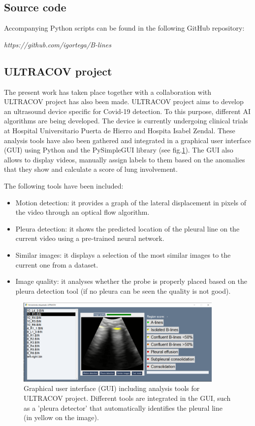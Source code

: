 \documentclass[12pt]{article} %
\begin{document}
\subsection{Source code}
Accompanying Python scripts can be found in the following GitHub repository:

{\textit{https://github.com/igortega/B-lines}}


\subsection{ULTRACOV project}
	The present work has taken place together with a collaboration with ULTRACOV project has also been made. ULTRACOV project \cite{ultracov} aims to develop an ultrasound device specific for Covid-19 detection. To this purpose, different AI algorithms are being developed. The device is currently undergoing clinical trials at Hospital Universitario Puerta de Hierro and Hospita Isabel Zendal.
	These analysis tools have also been gathered and integrated in a graphical user interface (GUI) using Python and the PySimpleGUI library (see fig.\ref{GUI}). The GUI also allows to display videos, manually assign labels to them based on the anomalies that they show and calculate a score of lung involvement. 
	
	The following tools have been included:
	\begin{itemize}
	\item Motion detection: it provides a graph of the lateral displacement in pixels of the video through an optical flow algorithm.
	\item Pleura detection: it shows the predicted location of the pleural line on the current video using a pre-trained neural network.
	\item Similar images: it displays a selection of the most similar images to the current one from a dataset.
	\item Image quality: it analyses whether the probe is properly placed based on the pleura detection tool (if no pleura can be seen the quality is not good).
	\end{itemize}
	
\begin{figure}[h]
\centering
\includegraphics[width=0.9\textwidth]{figuras/ultracov_GUI.png}
\caption{\small Graphical user interface (GUI) including analysis tools for ULTRACOV project. Different tools are integrated in the GUI, such as a 'pleura detector' that automatically identifies the pleural line (in yellow on the image).}
\label{GUI}
\end{figure}

\newpage
\newpage


\end{document}
